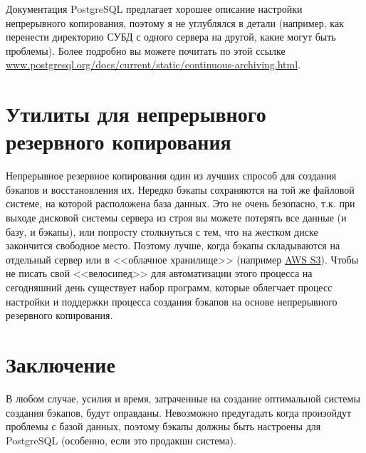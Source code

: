 Документация PostgreSQL предлагает хорошее описание настройки непрерывного копирования, поэтому я не углублялся в детали (например, как перенести директорию СУБД с одного сервера на другой, какие могут быть проблемы). Более подробно вы можете почитать по этой ссылке \href{http://www.postgresql.org/docs/current/static/continuous-archiving.html}{www.postgresql.org/docs/current/static/continuous-archiving.html}.

\section{Утилиты для непрерывного резервного копирования}

Непрерывное резервное копирования один из лучших спрособ для создания бэкапов и восстановления их. Нередко бэкапы сохраняются на той же файловой системе, на которой расположена база данных. Это не очень безопасно, т.к. при выходе дисковой системы сервера из строя вы можете потерять все данные (и базу, и бэкапы), или попросту столкнуться с тем, что на жестком диске закончится свободное место. Поэтому лучше, когда бэкапы складываются на отдельный сервер или в <<облачное хранилище>> (например \href{http://aws.amazon.com/s3/}{AWS S3}). Чтобы не писать свой <<велосипед>> для автоматизации этого процесса на сегодняшний день существует набор программ, которые облегчает процесс настройки и поддержки процесса создания бэкапов на основе непрерывного резервного копирования.




\section{Заключение}

В любом случае, усилия и время, затраченные на создание оптимальной системы создания бэкапов, будут оправданы. Невозможно предугадать когда произойдут проблемы с базой данных, поэтому бэкапы должны быть настроены для PostgreSQL (особенно, если это продакшн система).